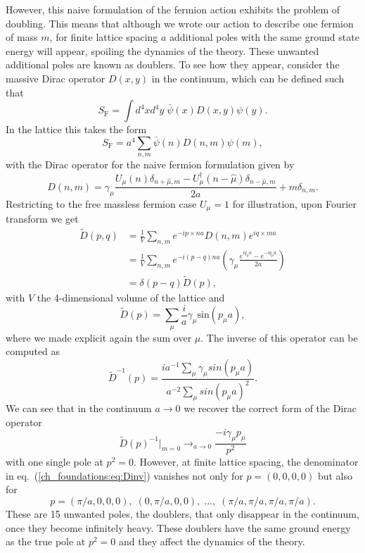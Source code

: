 However, this naive formulation of the fermion action exhibits the problem of doubling. This means that although we wrote our action to describe one fermion of mass $m$, for finite lattice spacing $a$ additional poles with the same ground state energy will appear, spoiling the dynamics of the theory. These unwanted additional poles are known as doublers. To see how they appear, consider the massive Dirac operator $D(x,y)$ in the continuum, which can be defined such that
\begin{equation}
S_{\textrm{F}}=\int d^4xd^4y\;\bar{\psi}(x)D(x,y)\psi(y).
\end{equation}
In the lattice this takes the form
\begin{equation}
S_{\textrm{F}}=a^4\sum_{n,m}\bar{\psi}(n)D(n,m)\psi(m),
\end{equation}
with the Dirac operator for the naive fermion formulation given by
\begin{equation}
D(n,m)=\gamma_{\mu}\frac{U_{\mu}(n)\delta_{n+\hat{\mu},m}-U_{\mu}^{\dagger}(n-\hat{\mu})\delta_{n-\hat{\mu},m}}{2a}+m\delta_{n,m}.
\end{equation}
Restricting to the free massless fermion case $U_{\mu}=1$ for illustration, upon Fourier transform we get
\begin{align}
\tilde{D}(p,q)&=\frac{1}{V}\sum_{n,m}e^{-ip\times na}D(n,m)e^{iq\times ma}\\
&=\frac{1}{V}\sum_{n,m}e^{-i(p-q)na}\left(\gamma_{\mu}\frac{e^{iq_{\mu}a}-e^{-iq_{\mu}a}}{2a}\right)\\
&=\delta(p-q)\tilde{D}(p),
\end{align}
with $V$ the 4-dimensional volume of the lattice and
\begin{equation}
\tilde{D}(p)=\sum_{\mu}\frac{i}{a}\gamma_{\mu}\textrm{sin}(p_{\mu}a),
\end{equation}
where we made explicit again the sum over $\mu$. The inverse of this operator can be computed as
\begin{equation}
\label{ch_foundations:eq:Dinv}
\tilde{D}^{-1}(p)=\frac{ia^{-1}\sum_{\mu}\gamma_{\mu}sin(p_{\mu}a)}{a^{-2}\sum_{\mu}sin(p_{\mu}a)^2}.
\end{equation}
We can see that in the continuum $a\rightarrow0$ we recover the correct form of the Dirac operator
\begin{equation}
\tilde{D}(p)^{-1}|_{m=0}\rightarrow_{a\rightarrow0}\frac{-i\gamma_{\mu}p_{\mu}}{p^2}
\end{equation}
with one single pole at $p^2=0$. However, at finite lattice spacing, the denominator in eq.~(\ref{ch_foundations:eq:Dinv}) vanishes not only for $p=(0,0,0,0)$ but also for 
\begin{equation}
p=(\pi/a,0,0,0),\;(0,\pi/a,0,0),\;...,\;(\pi/a,\pi/a,\pi/a,\pi/a).
\end{equation}
These are 15 unwanted poles, the doublers, that only disappear in the continuum, once they become infinitely heavy. These doublers have the same ground energy as the true pole at $p^2=0$ and they affect the dynamics of the theory. 

